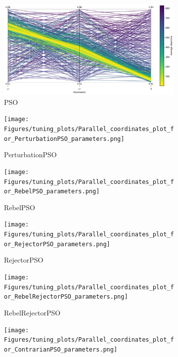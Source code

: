 \begin{figure}[H]
    \centering
    \begin{subfigure}{0.49\textwidth}
        \centering
        \includegraphics[width=1\textwidth]{Figures/tuning_plots/Parallel_coordinates_plot_for_PSO_parameters.png}
        \caption{PSO}
    \end{subfigure}
    \begin{subfigure}{0.49\textwidth}
        \centering
        \texttt{[image: Figures/tuning\_plots/Parallel\_coordinates\_plot\_for\_PerturbationPSO\_parameters.png]}
        \caption{PerturbationPSO}\label{fig:perturbation_params}
    \end{subfigure}
    \begin{subfigure}{0.49\textwidth}
        \centering
        \texttt{[image: Figures/tuning\_plots/Parallel\_coordinates\_plot\_for\_RebelPSO\_parameters.png]}
        \caption{RebelPSO}
    \end{subfigure}
    \begin{subfigure}{0.49\textwidth}
        \centering
        \texttt{[image: Figures/tuning\_plots/Parallel\_coordinates\_plot\_for\_RejectorPSO\_parameters.png]}
        \caption{RejectorPSO}
    \end{subfigure}
        \begin{subfigure}{0.49\textwidth}
        \centering
        \texttt{[image: Figures/tuning\_plots/Parallel\_coordinates\_plot\_for\_RebelRejectorPSO\_parameters.png]}
        \caption{RebelRejectorPSO}
    \end{subfigure}
        \begin{subfigure}{0.49\textwidth}
        \centering
        \texttt{[image: Figures/tuning\_plots/Parallel\_coordinates\_plot\_for\_ContrarianPSO\_parameters.png]}

\end{subfigure}
\end{figure}

